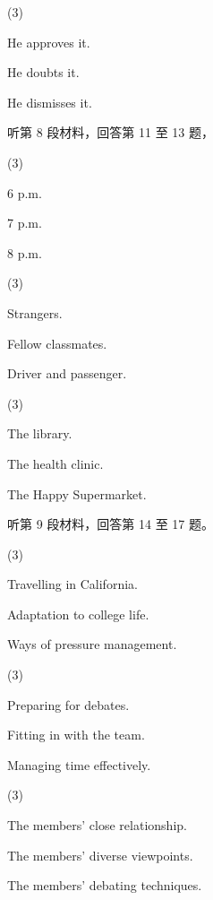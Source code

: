 \documentclass{英语试卷}
\begin{document}
\begin{choices}(3)
  \item He approves it.
  \item He doubts it.
  \item He dismisses it.
\end{choices}
\par 听第 8 段材料，回答第 11 至 13 题，\par
{}
\begin{choices}(3)
  \item 6 p.m.
  \item 7 p.m.
  \item 8 p.m.
\end{choices}
\begin{choices}(3)
  \item Strangers.
  \item Fellow classmates.
  \item Driver and passenger.
\end{choices}
\begin{choices}(3)
  \item The library.
  \item The health clinic.
  \item The Happy Supermarket.
\end{choices}
\par 听第 9 段材料，回答第 14 至 17 题。\par
{}
\begin{choices}(3)
  \item Travelling in California.
  \item Adaptation to college life.
  \item Ways of pressure management.
\end{choices}
\begin{choices}(3)
  \item Preparing for debates.
  \item Fitting in with the team.
  \item Managing time effectively.
\end{choices}
\begin{choices}(3)
  \item The members' close relationship.
  \item The members' diverse viewpoints.
  \item The members' debating techniques.
\end{choices}
\end{document}
